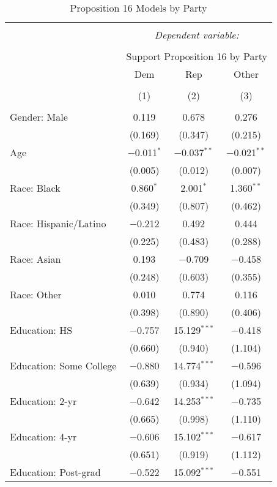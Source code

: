 
\begin{table}[!htbp] \centering 
  \caption{Proposition 16 Models by Party} 
  \label{tab:partisan_prop16_long} 
\footnotesize 
\begin{tabular}{@{\extracolsep{5pt}}lccc} 
\\[-1.8ex]\hline 
\hline \\[-1.8ex] 
 & \multicolumn{3}{c}{\textit{Dependent variable:}} \\ 
\cline{2-4} 
\\[-1.8ex] & \multicolumn{3}{c}{Support Proposition 16 by Party} \\ 
 & Dem & Rep & Other \\ 
\\[-1.8ex] & (1) & (2) & (3)\\ 
\hline \\[-1.8ex] 
 Gender: Male & 0.119 & 0.678 & 0.276 \\ 
  & (0.169) & (0.347) & (0.215) \\ 
  Age & $-$0.011$^{*}$ & $-$0.037$^{**}$ & $-$0.021$^{**}$ \\ 
  & (0.005) & (0.012) & (0.007) \\ 
  Race: Black & 0.860$^{*}$ & 2.001$^{*}$ & 1.360$^{**}$ \\ 
  & (0.349) & (0.807) & (0.462) \\ 
  Race: Hispanic/Latino & $-$0.212 & 0.492 & 0.444 \\ 
  & (0.225) & (0.483) & (0.288) \\ 
  Race: Asian & 0.193 & $-$0.709 & $-$0.458 \\ 
  & (0.248) & (0.603) & (0.355) \\ 
  Race: Other & 0.010 & 0.774 & 0.116 \\ 
  & (0.398) & (0.890) & (0.406) \\ 
  Education: HS & $-$0.757 & 15.129$^{***}$ & $-$0.418 \\ 
  & (0.660) & (0.940) & (1.104) \\ 
  Education: Some College & $-$0.880 & 14.774$^{***}$ & $-$0.596 \\ 
  & (0.639) & (0.934) & (1.094) \\ 
  Education: 2-yr & $-$0.642 & 14.253$^{***}$ & $-$0.735 \\ 
  & (0.665) & (0.998) & (1.110) \\ 
  Education: 4-yr & $-$0.606 & 15.102$^{***}$ & $-$0.617 \\ 
  & (0.651) & (0.919) & (1.112) \\ 
  Education: Post-grad & $-$0.522 & 15.092$^{***}$ & $-$0.551 \\ 

\end{tabular}
\end{table}
